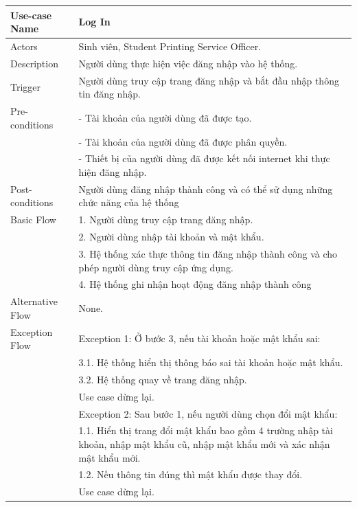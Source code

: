 \begin{enumerate}[a)]
    \begin{longtable}{|l|p{10cm}|}
        \hline
        \endhead
        \hline
        \endfoot
        Use-case Name & \textbf{Log In}\\
        \hline
        Actors & Sinh viên, Student Printing Service Officer. \\
        \hline
        Description & Người dùng thực hiện việc đăng nhập vào hệ thống.\\
        \hline
        Trigger & Người dùng truy cập trang đăng nhập và bắt đầu nhập thông tin đăng nhập.\\
        \hline
        Pre-conditions & - Tài khoản của người dùng đã được tạo.\\
                       & - Tài khoản của người dùng đã được phân quyền.\\
                       & - Thiết bị của người dùng đã được kết nối internet khi thực hiện đăng nhập.\\
        \hline
        Post-conditions & Người dùng đăng nhập thành công và có thể sử dụng những chức năng của hệ thống\\
        \hline
        Basic Flow & 1. Người dùng truy cập trang đăng nhập.\\
        & 2. Người dùng nhập tài khoản và mật khẩu.\\
        & 3. Hệ thống xác thực thông tin đăng nhập thành công và cho phép người dùng truy cập ứng dụng.\\
        & 4. Hệ thống ghi nhận hoạt động đăng nhập thành công \\
        \hline
        Alternative Flow & None.\\
        \hline
        Exception Flow & Exception 1: Ở bước 3, nếu tài khoản hoặc mật khẩu sai:\\
        & \hspace{1em} 3.1. Hệ thống hiển thị thông báo sai tài khoản hoặc mật khẩu.\\
        & \hspace{1em} 3.2. Hệ thống quay về trang đăng nhập. \\
        &\hspace{1em} Use case dừng lại.\\
        
        & Exception 2: Sau bước 1, nếu người dùng chọn đổi mật khẩu:\\
        & \hspace{1em} 1.1. Hiển thị trang đổi mật khẩu bao gồm 4 trường nhập tài khoản, nhập mật khẩu cũ, nhập mật khẩu mới và xác nhận mật khẩu mới. \\
        & \hspace{1em} 1.2. Nếu thông tin đúng thì mật khẩu được thay đổi.\\
        &\hspace{1em} Use case dừng lại.\\
    \end{longtable}
    \end{enumerate}